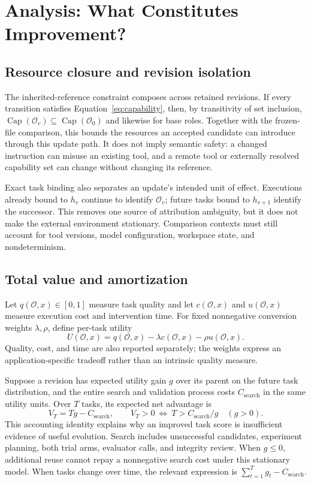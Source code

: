 \section{Analysis: What Constitutes Improvement?}\label{sec:analysis}

\subsection{Resource closure and revision isolation}
The inherited-reference constraint composes across retained revisions. If every transition satisfies Equation~\ref{eq:capability}, then, by transitivity of set inclusion, $\operatorname{Cap}(\mathcal O_v)\subseteq\operatorname{Cap}(\mathcal O_0)$ and likewise for base roles. Together with the frozen-file comparison, this bounds the resources an accepted candidate can introduce through this update path. It does not imply semantic safety: a changed instruction can misuse an existing tool, and a remote tool or externally resolved capability set can change without changing its reference.

Exact task binding also separates an update's intended unit of effect. Executions already bound to $h_v$ continue to identify $\mathcal O_v$; future tasks bound to $h_{v+1}$ identify the successor. This removes one source of attribution ambiguity, but it does not make the external environment stationary. Comparison contexts must still account for tool versions, model configuration, workspace state, and nondeterminism.

\subsection{Total value and amortization}
Let $q(\mathcal O,x)\in[0,1]$ measure task quality and let $c(\mathcal O,x)$ and $u(\mathcal O,x)$ measure execution cost and intervention time. For fixed nonnegative conversion weights $\lambda,\rho$, define per-task utility
\begin{equation}
U(\mathcal O,x)=q(\mathcal O,x)-\lambda c(\mathcal O,x)-\rho u(\mathcal O,x).
\label{eq:utility}
\end{equation}
Quality, cost, and time are also reported separately; the weights express an application-specific tradeoff rather than an intrinsic quality measure.

Suppose a revision has expected utility gain $g$ over its parent on the future task distribution, and the entire search and validation process costs $C_{\mathrm{search}}$ in the same utility units. Over $T$ tasks, its expected net advantage is
\begin{equation}
V_T=Tg-C_{\mathrm{search}},\qquad
V_T>0\ \Longleftrightarrow\ T>C_{\mathrm{search}}/g\quad(g>0).
\label{eq:amortization}
\end{equation}
This accounting identity explains why an improved task score is insufficient evidence of useful evolution. Search includes unsuccessful candidates, experiment planning, both trial arms, evaluator calls, and integrity review. When $g\leq0$, additional reuse cannot repay a nonnegative search cost under this stationary model. When tasks change over time, the relevant expression is $\sum_{t=1}^{T}g_t-C_{\mathrm{search}}$.

